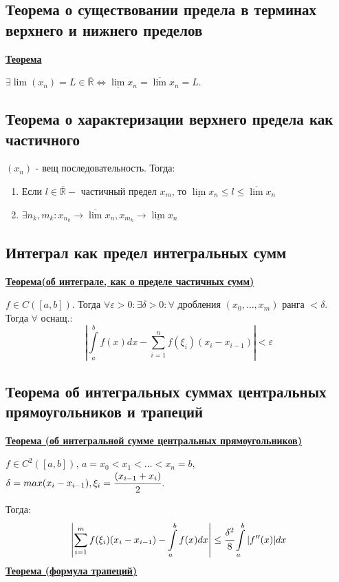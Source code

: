 \documentclass{article}
\newcommand{\integral}[2]{\displaystyle\int\limits_{#1}^{#2}}
\newcommand{\thmm}[1]{\underline{\textbf{#1}}}
\begin{document}
\subsection{Теорема о существовании предела в терминах верхнего и нижнего пределов}

\thmm{Теорема}

$\exists \lim(x_n) = L \in \overline{\mathbb{R}} \Leftrightarrow \underline{\lim}x_n = \overline{\lim} x_n = L$.


\subsection{Теорема о характеризации верхнего предела как частичного}

$(x_n)$ - вещ последовательность. Тогда:

\begin{enumerate}
    \item Если $l \in \overline{\mathbb{R}} - $ частичный предел $x_m$, то $\underline{\lim}x_n\leq l \leq \overline{\lim}x_n$
    \item $\exists n_k, m_k: x_{n_k}\rightarrow \overline{\lim} x_{n}, x_{m_k}\rightarrow \underline{\lim}x_n$
\end{enumerate}

\subsection{Интеграл как предел интегральных сумм}

\thmm{Теорема(об интеграле, как о пределе частичных сумм)}

$f\in C([a,b])$. Тогда $\forall \varepsilon >0: \exists \delta >0 : \forall$ дробления $(x_0,\ldots,x_m)$ ранга $< \delta$. Тогда $\forall$ оснащ.:
$$\left|\integral{a}{b}f(x)dx - \sum\limits_{i=1}^nf(\xi_i) (x_i-x_{i-1})\right|<\varepsilon$$

\subsection{Теорема об интегральных суммах центральных прямоугольников и трапеций}

\thmm{Теорема (об интегральной сумме центральных прямоугольников)}

$f \in C^2([a,b])$, $a = x_0<x_1<\ldots< x_n =b$, $\delta = max(x_i-x_{i-1}), \xi_i = \cfrac{(x_{i-1}+x_i)}{2}$.

Тогда:
$$\left|\sum\limits_{i=1}^m f(\xi_i)(x_i-x_{i-1}) - \integral{a}{b}f(x) dx\right|\leq \cfrac{\delta^2}{8}\integral{a}{b} |f''(x)|dx$$
\thmm{Теорема (формула трапеций)}
\end{document}
